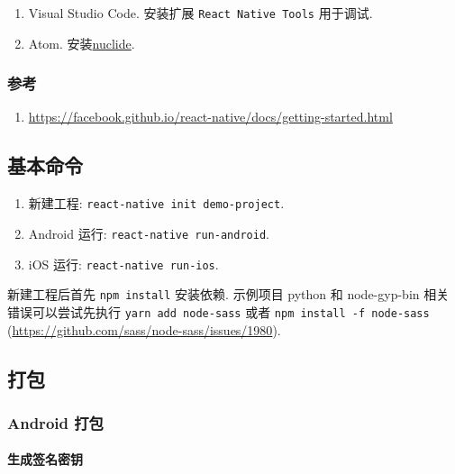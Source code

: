 \begin{enumerate}
\def\labelenumi{\arabic{enumi}.}
\tightlist
\item
  Visual Studio Code. 安装扩展 \lstinline!React Native Tools! 用于调试.
\item
  Atom. 安装\href{https://atom.io/packages/nuclide}{nuclide}.
\end{enumerate}

\subsubsection{参考}\label{ux53c2ux8003}

\begin{enumerate}
\def\labelenumi{\arabic{enumi}.}
\tightlist
\item
  \url{https://facebook.github.io/react-native/docs/getting-started.html}
\end{enumerate}

\subsection{基本命令}\label{ux57faux672cux547dux4ee4}

\begin{enumerate}
\def\labelenumi{\arabic{enumi}.}
\tightlist
\item
  新建工程: \lstinline!react-native init demo-project!.
\item
  Android 运行: \lstinline!react-native run-android!.
\item
  iOS 运行: \lstinline!react-native run-ios!.
\end{enumerate}

新建工程后首先 \lstinline!npm install! 安装依赖. 示例项目 python 和
node-gyp-bin 相关错误可以尝试先执行 \lstinline!yarn add node-sass! 或者
\lstinline!npm install -f node-sass!
(\url{https://github.com/sass/node-sass/issues/1980}).

\subsection{打包}\label{ux6253ux5305}

\subsubsection{Android 打包}\label{android-ux6253ux5305}

\paragraph{生成签名密钥}\label{ux751fux6210ux7b7eux540dux5bc6ux94a5}

